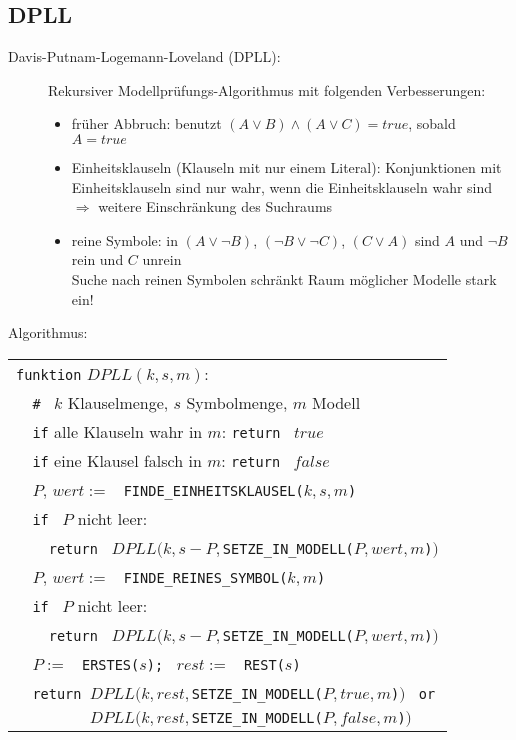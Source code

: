 \subsection{DPLL}
\begin{description}
\item[Davis-Putnam-Logemann-Loveland (DPLL):] Rekursiver Modellprüfungs-Algorithmus mit folgenden Verbesserungen:
\begin{itemize}
\item früher Abbruch: benutzt $(A \vee B) \wedge (A \vee C) = true$, sobald $A = true$
\item Einheitsklauseln (Klauseln mit nur einem Literal): Konjunktionen mit Einheitsklauseln sind nur wahr, wenn die Einheitsklauseln wahr sind \\ $\Rightarrow$ weitere Einschränkung des Suchraums
\item reine Symbole: in $(A \vee \neg B)$, $(\neg B \vee \neg C)$, $(C \vee A)$ sind $A$ und $\neg B$ rein und $C$ unrein \\ Suche nach reinen Symbolen schränkt Raum möglicher Modelle stark ein!
\end{itemize}
\end{description}
Algorithmus:
\begin{center}
\begin{tabular}{l}
\verb|funktion| $DPLL(k,s,m)$: \\
\verb|  # | $k$ Klauselmenge, $s$ Symbolmenge, $m$ Modell \\
\verb|  if| alle Klauseln wahr in $m$: \verb|return | $true$ \\
\verb|  if| eine Klausel falsch in $m$: \verb|return | $false$ \\
\verb|  |$P, \, wert :=$ \verb| FINDE_EINHEITSKLAUSEL(|$k,s,m$\verb|)| \\
\verb|  if | $P$ nicht leer: \\
\verb|    return | $DPLL(k,s-P,$\verb|SETZE_IN_MODELL(|$P,wert,m$\verb|)|$)$ \\
\verb|  |$P, \, wert :=$ \verb| FINDE_REINES_SYMBOL(|$k,m$\verb|)| \\
\verb|  if | $P$ nicht leer: \\
\verb|    return | $DPLL(k,s-P,$\verb|SETZE_IN_MODELL(|$P,wert,m$\verb|)|$)$ \\
\verb|  |$P :=$ \verb| ERSTES(|$s$\verb|); | $rest :=$ \verb| REST(|$s$\verb|)| \\
\verb|  return |$DPLL(k, rest,$\verb|SETZE_IN_MODELL(|$P,true,m$\verb|)|$)$ \verb| or| \\
\verb|         |$DPLL(k, rest,$\verb|SETZE_IN_MODELL(|$P,false,m$\verb|)|$)$
\end{tabular}
\end{center}
